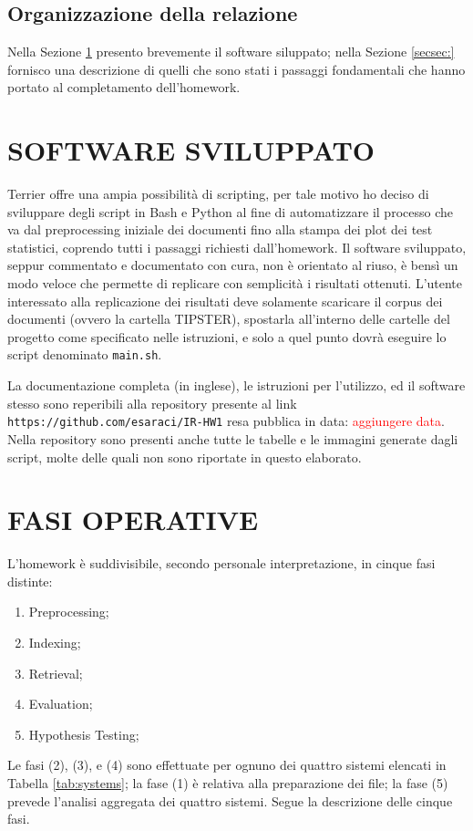 \documentclass[letterpaper, 10 pt, conference]{ieeeconf}  %
\newcommand\todo[1]{\textcolor{red}{#1}}
\begin{document}
\subsection{Organizzazione della relazione}
Nella Sezione \ref{sec:sw} presento brevemente il software siluppato; nella Sezione \ref{secsec:} fornisco una descrizione di quelli che sono stati i passaggi fondamentali che hanno portato al completamento dell'homework.

\section{SOFTWARE SVILUPPATO}\label{sec:sw}

Terrier offre una ampia possibilità di scripting, per tale motivo ho deciso di sviluppare degli script in Bash e Python al fine di automatizzare il processo che va dal preprocessing iniziale dei documenti fino alla stampa dei plot dei test statistici, coprendo tutti i passaggi richiesti dall'homework.
Il software sviluppato, seppur commentato e documentato con cura, non è orientato al riuso, è bensì un modo veloce che permette di replicare con semplicità i risultati ottenuti.
L'utente interessato alla replicazione dei risultati deve solamente scaricare il corpus dei documenti (ovvero la cartella TIPSTER), spostarla all'interno delle cartelle del progetto come specificato nelle istruzioni, e solo a quel punto dovrà eseguire lo script denominato \texttt{main.sh}.

La documentazione completa (in inglese), le istruzioni per l'utilizzo, ed il software stesso sono reperibili alla repository presente al link \texttt{https://github.com/esaraci/IR-HW1} resa pubblica in data: \todo{aggiungere data}. Nella repository sono presenti anche tutte le tabelle e le immagini generate dagli script, molte delle quali non sono riportate in questo elaborato.

\section{FASI OPERATIVE}\label{sec:devops}
L'homework è suddivisibile, secondo personale interpretazione, in cinque fasi distinte:
\begin{enumerate}
\item Preprocessing;
\item Indexing;
\item Retrieval;
\item Evaluation;
\item Hypothesis Testing;
\end{enumerate}
Le fasi (2), (3), e (4) sono effettuate per ognuno dei quattro sistemi elencati in Tabella \ref{tab:systems}; la fase (1) è relativa alla preparazione dei file; la fase (5) prevede l'analisi aggregata dei quattro sistemi. Segue la descrizione delle cinque fasi.
\end{document}
